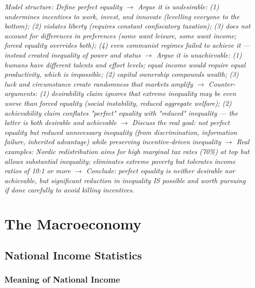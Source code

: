 \documentclass[11pt, a4paper, twoside]{book}
\begin{document}
\begin{exampractice}
\begin{enumerate}[leftmargin=*]
\textit{Model structure: Define perfect equality $\to$ Argue it is undesirable: (1) undermines incentives to work, invest, and innovate (levelling everyone to the bottom); (2) violates liberty (requires constant confiscatory taxation); (3) does not account for differences in preferences (some want leisure, some want income; forced equality overrides both); (4) even communist regimes failed to achieve it — instead created inequality of power and status $\to$ Argue it is unachievable: (1) humans have different talents and effort levels; equal income would require equal productivity, which is impossible; (2) capital ownership compounds wealth; (3) luck and circumstance create randomness that markets amplify $\to$ Counter-arguments: (1) desirability claim ignores that extreme inequality may be even worse than forced equality (social instability, reduced aggregate welfare); (2) achievability claim conflates "perfect" equality with "reduced" inequality — the latter is both desirable and achievable $\to$ Discuss the real goal: not perfect equality but reduced \emph{unnecessary} inequality (from discrimination, information failure, inherited advantage) while preserving incentive-driven inequality $\to$ Real examples: Nordic redistribution aims for high marginal tax rates (70\%) at top but allows substantial inequality; eliminates extreme poverty but tolerates income ratios of 10:1 or more $\to$ Conclude: perfect equality is neither desirable nor achievable, but significant reduction in inequality IS possible and worth pursuing if done carefully to avoid killing incentives.}

\end{enumerate}
\end{exampractice}

\chapter{The Macroeconomy}

\section{National Income Statistics}

\subsection{Meaning of National Income}
\end{document}
